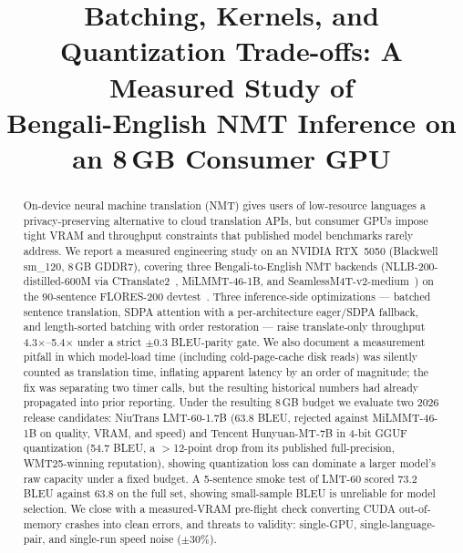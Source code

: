 \documentclass[conference]{IEEEtran}
\newcommand{\NLLBSPEEDUP}{5.4$\times$}
\newcommand{\SEAMLESSSPEEDUP}{4.3$\times$}
\newcommand{\LMTBLEU}{63.8}
\newcommand{\LMTSMOKEBLEU}{73.2}
\newcommand{\HUNYUANBLEU}{54.7}
\begin{document}

\title{Batching, Kernels, and Quantization Trade-offs: A Measured Study of\\
Bengali-English NMT Inference on an 8\,GB Consumer GPU}

\author{
}

\maketitle

\begin{abstract}
On-device neural machine translation (NMT) gives users of low-resource
languages a privacy-preserving alternative to cloud translation APIs, but
consumer GPUs impose tight VRAM and throughput constraints that published
model benchmarks rarely address. We report a measured engineering study on
an NVIDIA RTX~5050 (Blackwell sm\_120, 8\,GB GDDR7), covering three
Bengali-to-English NMT backends (NLLB-200-distilled-600M via
CTranslate2~\cite{ctranslate2_klein}, MiLMMT-46-1B, and
SeamlessM4T-v2-medium~\cite{seamlessm4t2023}) on the 90-sentence
FLORES-200 devtest~\cite{nllb2022}.
Three inference-side optimizations --- batched sentence translation, SDPA
attention with a per-architecture eager/SDPA fallback, and length-sorted
batching with order restoration --- raise translate-only throughput
\SEAMLESSSPEEDUP--\NLLBSPEEDUP{} under a strict $\pm$0.3 BLEU-parity gate.
We also document a measurement pitfall in which model-load time (including
cold-page-cache disk reads) was silently counted as translation time,
inflating apparent latency by an order of magnitude; the fix was separating
two timer calls, but the resulting historical numbers had already propagated
into prior reporting.
Under the resulting 8\,GB budget we evaluate two 2026 release candidates:
NiuTrans LMT-60-1.7B (\LMTBLEU{} BLEU, rejected against MiLMMT-46-1B on
quality, VRAM, and speed) and Tencent Hunyuan-MT-7B in 4-bit GGUF
quantization (\HUNYUANBLEU{} BLEU, a $>$12-point drop from its published
full-precision, WMT25-winning reputation), showing quantization loss can
dominate a larger model's raw capacity under a fixed budget. A 5-sentence
smoke test of LMT-60 scored \LMTSMOKEBLEU{} BLEU against \LMTBLEU{} on the
full set, showing small-sample BLEU is unreliable for model selection. We
close with a measured-VRAM pre-flight check converting CUDA out-of-memory
crashes into clean errors, and threats to validity: single-GPU,
single-language-pair, and single-run speed noise ($\pm$30\%).
\end{abstract}
\end{document}
